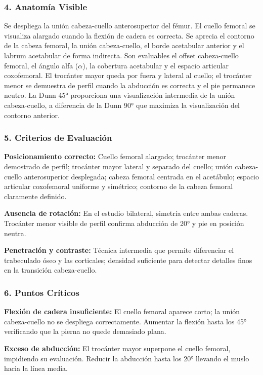 	\subsubsection*{4. Anatomía Visible}
	
	Se despliega la unión cabeza-cuello anterosuperior del fémur. El cuello femoral se visualiza alargado cuando la flexión de cadera es correcta. Se aprecia el contorno de la cabeza femoral, la unión cabeza-cuello, el borde acetabular anterior y el labrum acetabular de forma indirecta. Son evaluables el offset cabeza-cuello femoral, el ángulo alfa ($\alpha$), la cobertura acetabular y el espacio articular coxofemoral. El trocánter mayor queda por fuera y lateral al cuello; el trocánter menor se demuestra de perfil cuando la abducción es correcta y el pie permanece neutro. La Dunn 45° proporciona una visualización intermedia de la unión cabeza-cuello, a diferencia de la Dunn 90° que maximiza la visualización del contorno anterior.
	
	\subsubsection*{5. Criterios de Evaluación}
	
	\textbf{Posicionamiento correcto:} Cuello femoral alargado; trocánter menor demostrado de perfil; trocánter mayor lateral y separado del cuello; unión cabeza-cuello anterosuperior desplegada; cabeza femoral centrada en el acetábulo; espacio articular coxofemoral uniforme y simétrico; contorno de la cabeza femoral claramente definido.
	
	\textbf{Ausencia de rotación:} En el estudio bilateral, simetría entre ambas caderas. Trocánter menor visible de perfil confirma abducción de 20° y pie en posición neutra.
	
	\textbf{Penetración y contraste:} Técnica intermedia que permite diferenciar el trabeculado óseo y las corticales; densidad suficiente para detectar detalles finos en la transición cabeza-cuello.
	
	\subsubsection*{6. Puntos Críticos}
	
	\textbf{Flexión de cadera insuficiente:} El cuello femoral aparece corto; la unión cabeza-cuello no se despliega correctamente. Aumentar la flexión hasta los 45° verificando que la pierna no quede demasiado plana.
	
	\textbf{Exceso de abducción:} El trocánter mayor superpone el cuello femoral, impidiendo su evaluación. Reducir la abducción hasta los 20° llevando el muslo hacia la línea media.
	
